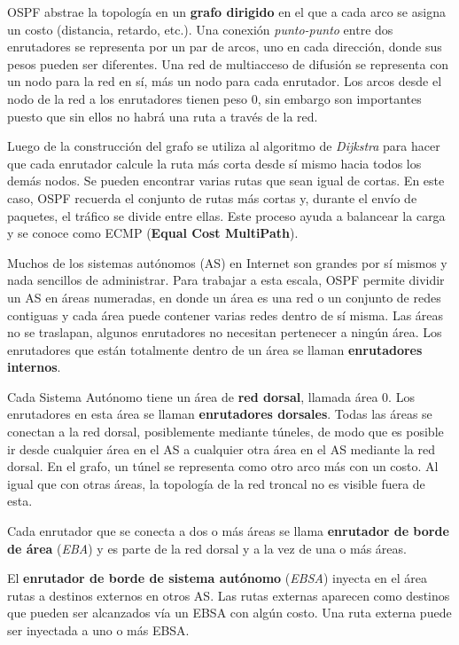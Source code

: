 	\par OSPF abstrae la topología en un \textbf{grafo dirigido} en el que a cada arco se asigna un costo (distancia, retardo, etc.). Una conexión \textit{punto-punto} entre dos enrutadores se representa por un par de arcos, uno en cada dirección, donde sus pesos pueden ser diferentes. Una red de multiacceso de difusión se representa con un nodo
para la red en sí, más un nodo para cada enrutador. Los arcos desde el nodo de la red a los enrutadores tienen peso 0, sin embargo son importantes puesto que sin ellos no habrá una ruta a través de la red.

	\par Luego de la construcción del grafo se utiliza al algoritmo de \textit{Dijkstra} para hacer que cada enrutador calcule la ruta más corta desde sí mismo hacia todos los demás nodos. Se pueden encontrar varias rutas que sean igual de cortas. En este caso, OSPF recuerda el conjunto de rutas más cortas y, durante el envío de paquetes, el tráfico se divide entre ellas. Este proceso ayuda a balancear la carga y se conoce como ECMP (\textbf{Equal Cost MultiPath}).

	\par Muchos de los sistemas autónomos (AS) en Internet son grandes por sí mismos y nada sencillos de administrar. Para trabajar a esta escala, OSPF permite dividir un AS en áreas numeradas, en donde un área es una red o un conjunto de redes contiguas y cada área puede contener varias redes dentro de sí misma. Las áreas no se traslapan, algunos enrutadores no necesitan pertenecer a ningún área. Los enrutadores que están totalmente dentro de un área se llaman \textbf{enrutadores internos}.

	\par Cada Sistema Autónomo tiene un área de \textbf{red dorsal}, llamada área 0. Los enrutadores en esta área se llaman \textbf{enrutadores dorsales}. Todas las áreas se conectan a la red dorsal, posiblemente mediante túneles, de modo que es posible ir desde cualquier área en el AS a cualquier otra área en el AS mediante la red dorsal. En el grafo, un túnel se representa como otro arco más con un costo. Al igual que con otras áreas, la topología de la red troncal no es visible fuera de esta.

	\par Cada enrutador que se conecta a dos o más áreas se llama \textbf{enrutador de borde de área} (\textit{EBA}) y es parte de la red dorsal y a la vez de una o más áreas.

	\par El \textbf{enrutador de borde de sistema autónomo} (\textit{EBSA}) inyecta en el área rutas a destinos externos en otros AS. Las rutas externas aparecen como destinos que pueden ser alcanzados vía un EBSA con algún costo. Una ruta externa puede ser inyectada a uno o más EBSA.

